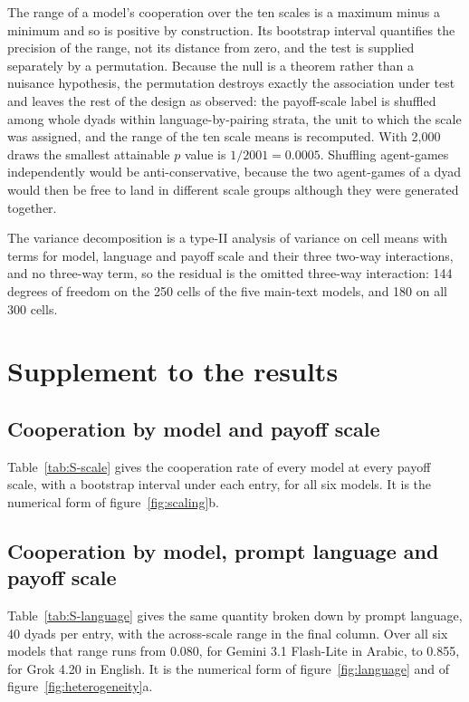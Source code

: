 \documentclass[openacc]{rsproca_new}
\begin{document}
The range of a model's cooperation over the ten scales is a maximum minus a
minimum and so is positive by construction. Its bootstrap interval quantifies
the precision of the range, not its distance from zero, and the test is
supplied separately by a permutation. Because the null is a theorem rather than
a nuisance hypothesis, the permutation destroys exactly the association under
test and leaves the rest of the design as observed: the payoff-scale label is
shuffled among whole dyads within language-by-pairing strata, the unit to which
the scale was assigned, and the range of the ten scale means is recomputed.
With 2{,}000 draws the smallest attainable $p$ value is $1/2001 = 0.0005$.
Shuffling agent-games independently would be anti-conservative, because the two
agent-games of a dyad would then be free to land in different scale groups
although they were generated together.

The variance decomposition is a type-II analysis of variance on cell means with
terms for model, language and payoff scale and their three two-way
interactions, and no three-way term, so the residual is the omitted three-way
interaction: 144 degrees of freedom on the 250 cells of the five main-text
models, and 180 on all 300 cells.


\section{Supplement to the results}\label{appendix:results}

\subsection{Cooperation by model and payoff scale}\label{appendix:by_scale}

Table~\ref{tab:S-scale} gives the cooperation rate of every model at every
payoff scale, with a bootstrap interval under each entry, for all six models.
It is the numerical form of figure~\ref{fig:scaling}b.

\subsection{Cooperation by model, prompt language and payoff scale}\label{appendix:by_language}

Table~\ref{tab:S-language} gives the same quantity broken down by prompt
language, 40 dyads per entry, with the across-scale range in the final column.
Over all six models that range runs from 0.080, for Gemini 3.1 Flash-Lite in
Arabic, to 0.855, for Grok 4.20 in English. It is the numerical form of
figure~\ref{fig:language} and of figure~\ref{fig:heterogeneity}a.
\end{document}
